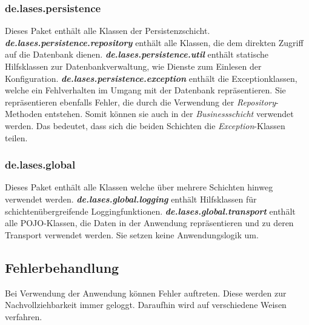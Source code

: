 \subsubsection{de.lases.persistence}\label{arch:persistence}
Dieses Paket enthält alle Klassen der Persistenzschicht.
\newline\newline
\textbf{\emph{de.lases.persistence.repository}}\label{arch:repository}
enthält alle Klassen, die dem direkten Zugriff auf die Datenbank dienen.
\newline\newline
\textbf{\emph{de.lases.persistence.util}}
enthält statische Hilfsklassen zur Datenbankverwaltung, wie Dienste zum Einlesen der Konfiguration.
\newline\newline
\textbf{\emph{de.lases.persistence.exception}}
enthält die Exceptionklassen, welche ein Fehlverhalten im Umgang mit der
Datenbank repräsentieren.
Sie repräsentieren ebenfalls Fehler, die durch die Verwendung der \emph{Repository}-Methoden
entstehen. Somit können sie auch in der \emph{Businessschicht} verwendet werden.
Das bedeutet, dass sich die beiden Schichten die \emph{Exception}-Klassen teilen.

\subsubsection{de.lases.global}
Dieses Paket enthält alle Klassen welche über mehrere Schichten hinweg
verwendet werden.
\newline\newline
\textbf{\emph{de.lases.global.logging}}
enthält Hilfsklassen für schichtenübergreifende Loggingfunktionen.
\newline\newline
\textbf{\emph{de.lases.global.transport}}\label{arch:transport}
enthält alle POJO-Klassen, die Daten in der Anwendung repräsentieren und zu deren
Transport verwendet werden. Sie setzen keine Anwendungslogik um.

\subsection{Fehlerbehandlung}
Bei Verwendung der Anwendung können Fehler auftreten. Diese werden zur Nachvollziehbarkeit
immer geloggt. Daraufhin wird auf verschiedene Weisen verfahren.

